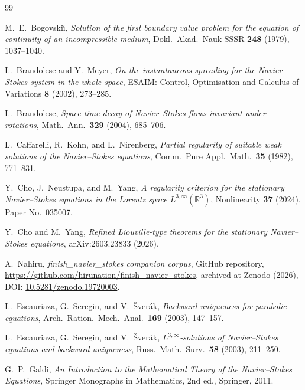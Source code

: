 \documentclass[11pt]{amsart}
\theoremstyle{definition}
\newcommand{\RR}{\mathbb{R}}
\begin{document}
\bigskip

\begin{thebibliography}{99}

M.~E.~Bogovski\u{\i},
\emph{Solution of the first boundary value problem for the equation of continuity of an incompressible medium},
Dokl.\ Akad.\ Nauk SSSR \textbf{248} (1979), 1037--1040.

L.~Brandolese and Y.~Meyer,
\emph{On the instantaneous spreading for the Navier--Stokes system in the whole space},
ESAIM: Control, Optimisation and Calculus of Variations
\textbf{8} (2002), 273--285.

L.~Brandolese,
\emph{Space-time decay of Navier--Stokes flows invariant under rotations},
Math.\ Ann.\ \textbf{329} (2004), 685--706.

L.~Caffarelli, R.~Kohn, and L.~Nirenberg,
\emph{Partial regularity of suitable weak solutions of the Navier--Stokes equations},
Comm.\ Pure Appl.\ Math.\ \textbf{35} (1982), 771--831.

Y.~Cho, J.~Neustupa, and M.~Yang,
\emph{A regularity criterion for the stationary Navier--Stokes equations in the Lorentz space $L^{3,\infty}(\RR^3)$},
Nonlinearity \textbf{37} (2024), Paper No.\ 035007.

Y.~Cho and M.~Yang,
\emph{Refined Liouville-type theorems for the stationary Navier--Stokes equations},
arXiv:2603.23833 (2026).

A.~Nahiru, \emph{finish\_navier\_stokes companion corpus}, GitHub
repository, \url{https://github.com/hirunation/finish_navier_stokes},
archived at Zenodo (2026), DOI:
\href{https://doi.org/10.5281/zenodo.19720003}{10.5281/zenodo.19720003}.

L.~Escauriaza, G.~Seregin, and V.~\v{S}ver\'ak,
\emph{Backward uniqueness for parabolic equations},
Arch.\ Ration.\ Mech.\ Anal.\ \textbf{169} (2003), 147--157.

L.~Escauriaza, G.~Seregin, and V.~\v{S}ver\'ak,
\emph{$L^{3,\infty}$-solutions of Navier--Stokes equations and backward uniqueness},
Russ.\ Math.\ Surv.\ \textbf{58} (2003), 211--250.

G.~P.~Galdi,
\emph{An Introduction to the Mathematical Theory of the Navier--Stokes Equations},
Springer Monographs in Mathematics, 2nd ed., Springer, 2011.


\end{thebibliography}
\end{document}
